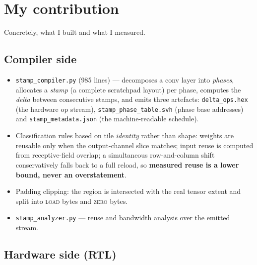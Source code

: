 \documentclass[11pt,a4paper]{article}
\newcommand{\op}[1]{\textsc{#1}}
\newcommand{\file}[1]{\texttt{\small #1}}
\begin{document}
\section{My contribution}

Concretely, what I built and what I measured.

\subsection{Compiler side}

\begin{itemize}[leftmargin=1.5em,itemsep=3pt]
  \item \file{stamp\_compiler.py} (985 lines) --- decomposes a conv layer into
        \emph{phases}, allocates a \emph{stamp} (a complete scratchpad layout)
        per phase, computes the \emph{delta} between consecutive stamps, and
        emits three artefacts: \file{delta\_ops.hex} (the hardware op stream),
        \file{stamp\_phase\_table.svh} (phase base addresses) and
        \file{stamp\_metadata.json} (the machine-readable schedule).
  \item Classification rules based on tile \emph{identity} rather than shape:
        weights are reusable only when the output-channel slice matches;
        input reuse is computed from receptive-field overlap; a simultaneous
        row-and-column shift conservatively falls back to a full reload, so
        \textbf{measured reuse is a lower bound, never an overstatement}.
  \item Padding clipping: the region is intersected with the real tensor
        extent and split into \op{load} bytes and \op{zero} bytes.
  \item \file{stamp\_analyzer.py} --- reuse and bandwidth analysis over the
        emitted stream.
\end{itemize}

\subsection{Hardware side (RTL)}
\end{document}
